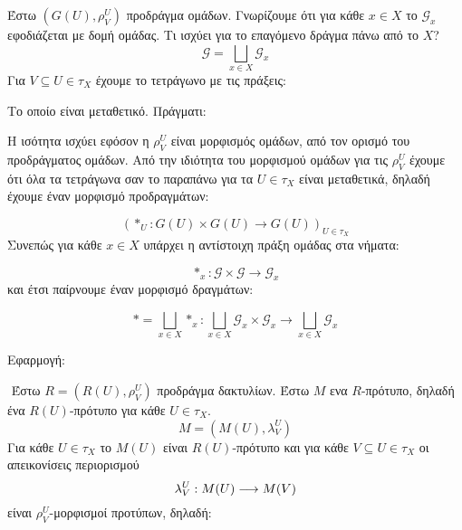 \vspace*{0.3cm}

\noindent Έστω $(G(U),\rho^U_V)$ προδράγμα ομάδων. Γνωρίζουμε ότι για κάθε $x \in X$ το $\mathcal{G}_x$ εφοδιάζεται με δομή ομάδας. Τι ισχύει για το επαγόμενο δράγμα πάνω από το $X$?
$$\mathcal{G} = \bigsqcup\limits_{x \in X}\mathcal{G}_x$$ Για $V\subseteq U \in \tau_X$ έχουμε το τετράγωνο με τις πράξεις:

\begin{figure}[H]
    \centering
\end{figure}

\noindent Το οποίο είναι μεταθετικό. Πράγματι:

\begin{figure}[H]
    \centering
\end{figure}

\noindent Η ισότητα ισχύει εφόσον η $\rho^U_V$ είναι μορφισμός ομάδων, από τον ορισμό του προδράγματος ομάδων. Από την ιδιότητα του μορφισμού ομάδων για τις $\rho^U_V$ έχουμε ότι όλα τα τετράγωνα σαν το παραπάνω για τα $U \in \tau_X$ είναι μεταθετικά, δηλαδή έχουμε έναν μορφισμό προδραγμάτων:

$$\left(*_U: G(U)\times G(U) \rightarrow G(U)\right)_{U\in\tau_X}$$ Συνεπώς για κάθε $x \in X$ υπάρχει η αντίστοιχη πράξη ομάδας στα νήματα:

$$*_x : \mathcal{G} \times \mathcal{G} \longrightarrow \mathcal{G}_x$$ και έτσι παίρνουμε έναν μορφισμό δραγμάτων:

$$* = \bigsqcup\limits_{x \in X}*_x : \bigsqcup \limits_{x \in X} \mathcal{G}_x \times \mathcal{G}_x \longrightarrow \bigsqcup\limits_{x \in X} \mathcal{G}_x$$

\noindent Εφαρμογή:

$ $\newline
Έστω $R = (R(U),\rho^U_V)$ προδράγμα δακτυλίων. Έστω $M$ ενα $R$-πρότυπο, δηλαδή ένα $R(U)$-πρότυπο για κάθε $U \in \tau_X$.
$$M = (M(U),\lambda^U_V)$$ Για κάθε $U \in \tau_X$ το $M(U)$ είναι $R(U)$-πρότυπο και για κάθε $V\subseteq U \in \tau_X$ οι απεικονίσεις περιορισμού
$$\lambda^U_V: M(U) \longrightarrow M(V)$$ είναι $\rho^U_V$-μορφισμοί προτύπων, δηλαδή:

